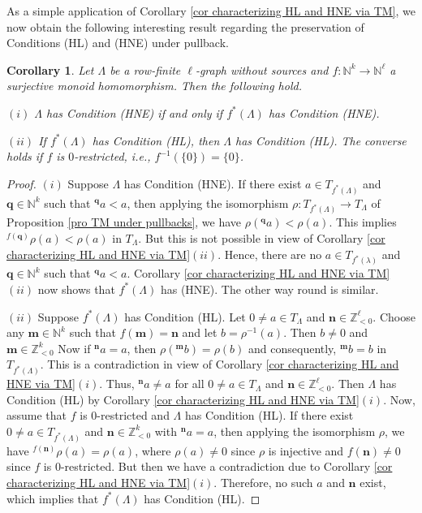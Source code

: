 \documentclass[a4paper,reqno,12pt]{amsart}
\numberwithin{equation}{section}
\newtheorem{cor}[thm]{Corollary}
\theoremstyle{definition}
\theoremstyle{remark}
\newcommand{\N}{\mathbf{n}}
\newcommand{\M}{\mathbf{m}}
\newcommand{\Q}{\mathbf{q}}
\begin{document}
As a simple application of Corollary \ref{cor characterizing HL and HNE via TM}, we now obtain the following interesting result regarding the preservation of Conditions (HL) and (HNE) under pullback. 
\begin{cor}\label{cor Condition HL and HNE under pullback}
Let $\Lambda$ be a row-finite $\ell$-graph without sources and $f:\mathbb{N}^k\longrightarrow \mathbb{N}^\ell$ a surjective monoid homomorphism. Then the following hold.

$(i)$ $\Lambda$ has Condition \textup{(HNE)} if and only if $f^*(\Lambda)$ has Condition \textup{(HNE)}. 

$(ii)$ If $f^*(\Lambda)$ has Condition \textup{(HL)}, then $\Lambda$ has Condition \textup{(HL)}. The converse holds if $f$ is $0$-restricted, i.e., $f^{-1}(\{0\})=\{0\}$. 
\end{cor}
\begin{proof}
$(i)$ Suppose $\Lambda$ has Condition (HNE). If there exist $a\in T_{f^*(\Lambda)}$ and $\Q\in \mathbb{N}^k$ such that $^\Q a< a$, then applying the isomorphism $\rho:T_{f^*(\Lambda)}\longrightarrow T_\Lambda$ of Proposition \ref{pro TM under pullbacks}, we have $\rho(^\Q a)<\rho(a)$. This implies $^{f(\Q)}\rho(a)<\rho(a)$ in $T_\Lambda$. But this is not possible in view of Corollary \ref{cor characterizing HL and HNE via TM}$(ii)$. Hence, there are no $a\in T_{f^*(\lambda)}$ and $\Q\in \mathbb{N}^k$ such that $^\Q a<a$. Corollary \ref{cor characterizing HL and HNE via TM}$(ii)$ now shows that $f^*(\Lambda)$ has (HNE). The other way round is similar.

$(ii)$ Suppose $f^*(\Lambda)$ has Condition (HL). Let $0\neq a\in T_\Lambda$ and $\N\in \mathbb{Z}_{<0}^\ell$. Choose any $\M\in \mathbb{N}^k$ such that $f(\M)=\N$ and let $b=\rho^{-1}(a)$. Then $b\neq 0$ and $\M\in \mathbb{Z}_{<0}^k$ Now if $^\N a=a$, then $\rho(^\M b)=\rho(b)$ and consequently, $^\M b=b$ in $T_{f^*(\Lambda)}$. This is a contradiction in view of Corollary \ref{cor characterizing HL and HNE via TM}$(i)$. Thus, $^\N a\neq a$ for all $0\neq a\in T_\Lambda$ and $\N\in \mathbb{Z}_{<0}^\ell$. Then $\Lambda$ has Condition (HL) by Corollary \ref{cor characterizing HL and HNE via TM}$(i)$. Now, assume that $f$ is $0$-restricted and $\Lambda$ has Condition (HL). If there exist $0\neq a\in T_{f^*(\Lambda)}$ and $\N\in \mathbb{Z}_{<0}^k$ with $^\N a=a$, then applying the isomorphism $\rho$, we have $^{f(\N)}\rho(a)=\rho(a)$, where $\rho(a)\neq 0$ since $\rho$ is injective and $f(\N)\neq 0$ since $f$ is $0$-restricted. But then we have a contradiction due to Corollary \ref{cor characterizing HL and HNE via TM}$(i)$. Therefore, no such $a$ and $\N$ exist, which implies that $f^*(\Lambda)$ has Condition (HL).     
\end{proof}
\end{document}
